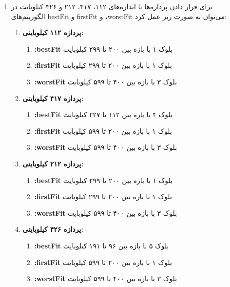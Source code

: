 \begin{qsolve}
	
	\begin{enumerate}
		\item برای قرار دادن پردازه‌ها با اندازه‌های ۱۱۲، ۴۱۷، ۲۱۲ و ۴۲۶ کیلوبایت در الگوریتم‌های bestFit و firstFit و ،worstFit می‌توان به صورت زیر عمل کرد:
		
		
		\begin{enumerate}
			\item \textbf{پردازه ۱۱۲ کیلوبایتی:}
			\begin{enumerate}
				\item \textbf{:bestFit} بلوک ۱ با بازه بین ۲۰۰ تا ۲۹۹ کیلوبایت
				\item \textbf{:firstFit} بلوک ۱ با بازه بین ۲۰۰ تا ۲۹۹ کیلوبایت
				\item \textbf{:worstFit} بلوک ۳ با بازه بین ۴۰۰ تا ۵۹۹ کیلوبایت
			\end{enumerate}
			
			\item \textbf{پردازه ۴۱۷ کیلوبایتی:}
			\begin{enumerate}
				\item \textbf{:bestFit} بلوک ۴ با بازه بین ۱۱۲ تا ۲۲۷ کیلوبایت
				\item \textbf{:firstFit} بلوک ۱ با بازه بین ۲۰۰ تا ۵۹۹ کیلوبایت
				\item \textbf{:worstFit} بلوک ۳ با بازه بین ۴۰۰ تا ۵۹۹ کیلوبایت
			\end{enumerate}
			
			\item \textbf{پردازه ۲۱۲ کیلوبایتی:}
			\begin{enumerate}
				\item \textbf{:bestFit} بلوک ۱ با بازه بین ۲۰۰ تا ۲۹۹ کیلوبایت
				\item \textbf{:firstFit} بلوک ۱ با بازه بین ۲۰۰ تا ۲۹۹ کیلوبایت
				\item \textbf{:worstFit} بلوک ۳ با بازه بین ۴۰۰ تا ۵۹۹ کیلوبایت
			\end{enumerate}
			
			\item \textbf{پردازه ۴۲۶ کیلوبایتی:}
			\begin{enumerate}
				\item \textbf{:bestFit} بلوک ۵ با بازه بین ۹۶ تا ۱۹۱ کیلوبایت
				\item \textbf{:firstFit} بلوک ۱ با بازه بین ۲۰۰ تا ۵۹۹ کیلوبایت
				\item \textbf{:worstFit} بلوک ۳ با بازه بین ۴۰۰ تا ۵۹۹ کیلوبایت
			\end{enumerate}
		\end{enumerate}
	\end{enumerate}	
\end{qsolve}






